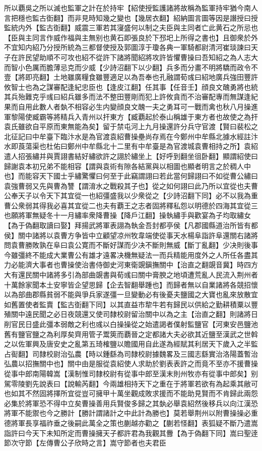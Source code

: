 所以覇吳之所以滅也監軍之計在於持牢【紹使授監護諸將故稱為監軍持牢猶今南人言把穩也監古衘翻】而非見時知幾之變也【幾居衣翻】紹納圖言圖等因是譖授曰授監統内外【監古衘翻】威震三軍若其寖盛何以制之夫臣與主同者亡此黄石之所忌也【臣與主同言作威作福與主無别也黄石即張良於下邳圯上所得之書也】且御衆於外不宜知内紹乃分授所統為三都督使授及郭圖淳于瓊各典一軍騎都尉清河崔琰諫曰天子在許民望助順不可攻也紹不從許下諸將聞紹將攻許皆懼曹操曰吾知紹之為人志大而智小色厲而膽薄忌克而少威【少詩沼翻下以少翻】兵多而分畫不明將驕而政令不壹【將即亮翻】土地雖廣糧食雖豐適足以為吾奉也孔融謂荀彧曰紹地廣兵強田豐許攸智士也為之謀審配逢紀忠臣也【逢皮江翻】任其事【任音壬】顔良文醜勇將也統其兵殆難克乎彧曰紹兵雖多而法不整田豐剛而犯上許攸貪而不治審配專而無謀逢紀果而自用此數人者埶不相容必生内變顔良文醜一夫之勇耳可一戰而禽也秋八月操進軍黎陽使臧霸等將精兵入青州以扞東方【臧覇起於泰山稱雄于東方者也故使之為扞袁氏雖欲自平原而東無能為矣】留于禁屯河上九月操還許分兵守官渡【賢曰裴松之北征記曰中牟臺下臨汴水是為官渡袁紹曹操壘尚存焉在今鄭州中牟縣北據水經註汴水即莨蕩渠也杜佑曰鄭州中牟縣北十二里有中牟臺是為官渡城袁曹相持之所】袁紹遣人招張繡并與賈詡書結好繡欲許之詡於繡坐上【好呼到翻坐徂卧翻】顯謂紹使曰歸謝袁本初兄弟不能相容【謂與袁術有隙各結黨與以相圖也顯者明言之於稠人中也】而能容天下國士乎繡驚懼曰何至于此竊謂詡曰若此當何歸詡曰不如從曹公繡曰袁強曹弱又先與曹為讐【謂淯水之戰殺其子也】從之如何詡曰此乃所以宜從也夫曹公奉天子以令天下其宜從一也紹彊盛我以少衆從之【少詩沼翻下同】必不以我為重曹公衆弱其得我必喜其宜從二也夫有覇王之志者固將釋私怨以明德於四海其宜從三也願將軍無疑冬十一月繡率衆降曹操【降戶江翻】操執繡手與歡宴為子均取繡女【為于偽翻取讀曰娶】拜揚武將軍表詡為執金吾封都亭侯【凡郡國縣道治所皆有都侯】關中諸將以袁曹方争皆中立顧望凉州牧韋端使從事天水楊阜詣許阜還關右諸將問袁曹勝敗孰在阜曰袁公寛而不斷好謀而少决不斷則無威【斷丁亂翻】少决則後事今雖彊終不能成大業曹公有雄才遠畧决機無疑法一而兵精能用度外之人所任各盡其力必能濟大事者也曹操使治書侍御史河東衛覬鎭撫關中【治直之翻覬音冀】時四方大有還民關中諸將多引為部曲覬書與荀彧曰關中膏腴之地頃遭荒亂人民流入荆州者十萬餘家聞本土安寧皆企望思歸【企去智翻舉踵也】而歸者無以自業諸將各競招懷以為部曲郡縣貧弱不能與爭兵家遂彊一旦變動必有後憂夫鹽國之大寶也亂來放散宜如舊置使者監賣【監古衘翻下同】以其直益市犂牛若有歸民以供給之勤耕積粟以豐殖關中遠民聞之必日夜競還又使司隸校尉留治關中以為之主【治直之翻】則諸將日削官民日盛此彊本弱敵之利也彧以白操操從之始遣謁者僕射監鹽官【河東安邑鹽池舊有鹽官鹽之為利厚矣齊用管子鬻筴而覇晉之定都諸大夫必欲其近鹽至漢武之世斡之以佐軍興及唐安史之亂第五琦榷鹽以贍國用自此遂為經賦其利居天下歲入之半監占䘖翻】司隸校尉治弘農【時以鍾繇為司隸校尉據魏畧及三國志繇實治洛陽蓋暫治弘農以招撫關中也】關中由是服從袁紹使人求助於劉表表許之而竟不至亦不援曹操從事中郎南陽韓嵩【漢制惟司隸校尉有從事中郎至漢末則州牧亦有從事中郎矣】别駕零陵劉先說表曰【說輸芮翻】今兩雄相持天下之重在于將軍若欲有為起乘其敝可也如其不然固將擇所宜從豈可擁甲十萬坐觀成敗求援而不能助見賢而不肯歸此兩怨必集於將軍恐不得中立矣曹操善用兵賢俊多歸之其埶必舉袁紹然後移兵以向江漢恐將軍不能禦也今之勝計【勝計謂諸計之中此計為勝也】莫若舉荆州以附曹操操必重德將軍長享福祚垂之後嗣此萬全之策也蒯越亦勸之【蒯若怪翻】表狐疑不斷乃遣嵩詣許曰今天下未知所定而曹操擁天子都許君為我觀其釁【為于偽翻下同】嵩曰聖逹節次守節【左傳曹公子欣時之言】嵩守節者也夫君臣